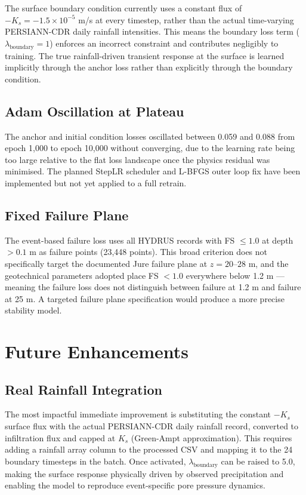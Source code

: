 \documentclass[12pt]{report}
\begin{document}
The surface boundary condition currently uses a constant flux of
$-K_s = -1.5 \times 10^{-5}$ m/s at every timestep, rather than
the actual time-varying PERSIANN-CDR daily rainfall intensities.
This means the boundary loss term ($\lambda_{\text{boundary}} = 1$)
enforces an incorrect constraint and contributes negligibly to
training. The true rainfall-driven transient response at the surface
is learned implicitly through the anchor loss rather than explicitly
through the boundary condition.

\subsection{Adam Oscillation at Plateau}

The anchor and initial condition losses oscillated between 0.059 and
0.088 from epoch 1,000 to epoch 10,000 without converging, due to
the learning rate being too large relative to the flat loss landscape
once the physics residual was minimised. The planned StepLR
scheduler and L-BFGS outer loop fix have been implemented but not
yet applied to a full retrain.

\subsection{Fixed Failure Plane}

The event-based failure loss uses all HYDRUS records with
FS $\leq 1.0$ at depth $> 0.1$ m as failure points (23,448 points).
This broad criterion does not specifically target the documented
Jure failure plane at $z = 20$--$28$ m, and the geotechnical
parameters adopted place FS $< 1.0$ everywhere below 1.2 m —
meaning the failure loss does not distinguish between failure at
1.2 m and failure at 25 m. A targeted failure plane specification
would produce a more precise stability model.

\section{Future Enhancements}

\subsection{Real Rainfall Integration}

The most impactful immediate improvement is substituting the
constant $-K_s$ surface flux with the actual PERSIANN-CDR daily
rainfall record, converted to infiltration flux and capped at $K_s$
(Green-Ampt approximation). This requires adding a rainfall array
column to the processed CSV and mapping it to the 24 boundary
timesteps in the batch. Once activated, $\lambda_{\text{boundary}}$
can be raised to 5.0, making the surface response physically driven
by observed precipitation and enabling the model to reproduce
event-specific pore pressure dynamics.
\end{document}
